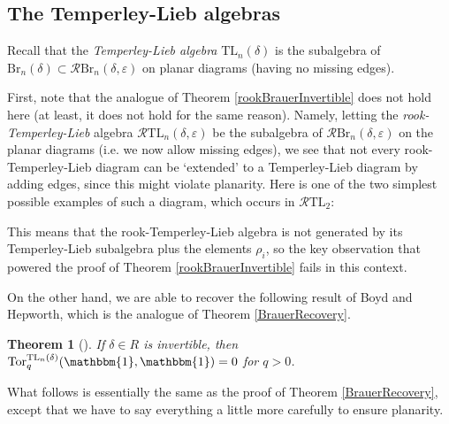 \documentclass[12pt]{amsart}
\newlength{\nodeheight}
\newlength{\nodewidth}
\theoremstyle{plain}
\newtheorem{theorem}{Theorem}[section]
\theoremstyle{definition} \newtheorem{definition}[theorem]{Definition}
\theoremstyle{plain}
\theoremstyle{plain} \newtheorem{proposition}[theorem]{Proposition}
\theoremstyle{plain} \newtheorem{conjecture}[theorem]{Conjecture}
\theoremstyle{plain} \newtheorem{corollary}[theorem]{Corollary}
\theoremstyle{remark} \newtheorem{claim}[theorem]{Claim}
\theoremstyle{remark} \newtheorem{remark}[theorem]{Remark}
\theoremstyle{remark} \newtheorem{example}[theorem]{Example}
\theoremstyle{remark} \newtheorem{comment}[theorem]{Comment}
\theoremstyle{definition} \newtheorem{question}[theorem]{Question}
\renewcommand{\t}{\mathbbm{1}}
\newcommand{\rook}{\mathcal{R}}
\newcommand{\RB}{\mathcal{R}\mathrm{Br}}
\newcommand{\Tor}{\mathrm{Tor}}
\newcommand{\Brauer}{\mathrm{Br}}
\newcommand{\TL}{\mathrm{TL}}
\begin{document}
\subsection{The Temperley-Lieb algebras} \label{subsectionInvTL}

Recall that the \emph{Temperley-Lieb algebra} $\TL_n(\delta)$ is the subalgebra of $\Brauer_n(\delta) \subset \RB_n(\delta,\varepsilon)$ on planar diagrams (having no missing edges).

First, note that the analogue of Theorem \ref{rookBrauerInvertible} does not hold here (at least, it does not hold for the same reason). Namely, letting the \emph{rook-Temperley-Lieb} algebra $\rook \TL_n(\delta, \varepsilon)$ be the subalgebra of $\rook \Brauer_n(\delta,\varepsilon)$ on the planar diagrams (i.e. we now allow missing edges), we see that not every rook-Temperley-Lieb diagram can be `extended' to a Temperley-Lieb diagram by adding edges, since this might violate planarity. Here is one of the two simplest possible examples of such a diagram, which occurs in $\rook \TL_2$:

\begin{center}
\end{center}

This means that the rook-Temperley-Lieb algebra is not generated by its Temperley-Lieb subalgebra plus the elements $\rho_i$, so the key observation that powered the proof of Theorem \ref{rookBrauerInvertible} fails in this context.

On the other hand, we are able to recover the following result of Boyd and Hepworth, which is the analogue of Theorem \ref{BrauerRecovery}.

\begin{theorem}[\cite{BH}] If $\delta \in R$ is invertible, then $\Tor_q^{\TL_n(\delta)}(\t,\t) = 0$ for $q>0$. \label{TLRecovery} \end{theorem}

What follows is essentially the same as the proof of Theorem \ref{BrauerRecovery}, except that we have to say everything a little more carefully to ensure planarity.
\end{document}
